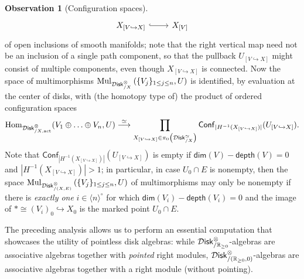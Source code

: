 \documentclass[10pt, reqno, twoside
, final
]{amsart}
\numberwithin{equation}{subsection}%
\theoremstyle{definition}
\theoremstyle{definition}
\theoremstyle{definition}
\theoremstyle{definition}
\theoremstyle{definition}
\theoremstyle{definition}
\theoremstyle{definition}
\theoremstyle{definition}
\theoremstyle{definition}
\theoremstyle{plain}
\theoremstyle{definition}
\newtheorem{obs}[defn]{Observation}
\theoremstyle{plain}
\theoremstyle{definition}
\theoremstyle{plain}
\theoremstyle{definition}
\theoremstyle{definition}
\theoremstyle{plain}
\theoremstyle{plain}
\theoremstyle{definition}
\theoremstyle{plain}
\theoremstyle{plain}
\theoremstyle{plain}
\begin{document}
\begin{obs}[Configuration spaces]
\[\begin{tikzcd}
    X_{[V\hookrightarrow X]} \ar[r,hook] & X_{[V]}
\end{tikzcd}
\]
of open inclusions of smooth manifolds; note that the right vertical map need not be an inclusion of a single path component, so that the pullback $U_{[V\hookrightarrow X]} $ might consist of multiple components, even though $X_{[V\hookrightarrow X]}$ is connected. Now the space of multimorphisms $\mathrm{Mul}_{\mathcal{D}\mathsf{isk}_{/X}^{\otimes}}\left(\{V_j\}_{1\leq j\leq n},U\right)$ is identified, by evaluation at the center of disks, with (the homotopy type of) the product of ordered configuration spaces
\[ \mathrm{Hom}_{\mathcal{D}\mathsf{isk}_{/X,\mathrm{act}}^{\otimes} }(V_1\oplus \ldots\oplus V_n,U)  \overset{\simeq}{\longrightarrow} \prod_{X_{[V\hookrightarrow X]}\in\pi_0\left(\mathcal{D}\mathsf{isk}^{\simeq}_{/X}\right)} \mathsf{Conf}_{|H^{-1}(X_{[V\hookrightarrow X]})|}(U_{[V\hookrightarrow X]}). \]
Note that $\mathsf{Conf}_{|H^{-1}(X_{[V\hookrightarrow X]})|}(U_{[V\hookrightarrow X]})$ is empty if $\mathsf{dim}(V)-\mathsf{depth}(V)=0$ and $|H^{-1}(X_{[V\hookrightarrow X]})|>1$; in particular, in case $U_0\cap E$ is nonempty, then the space $\mathrm{Mul}_{\mathcal{D}\mathsf{isk}_{/(X,E)}^{\otimes}}\left(\{V_j\}_{1\leq j\leq n},U\right)$ of multimorphisms may only be nonempty if there is \emph{exactly one} $i\in \langle n\rangle^{\circ}$ for which $\mathsf{dim}(V_i)-\mathsf{depth}(V_i)=0$ and the image of $*\cong (V_i)_0\hookrightarrow X_0$ is the marked point $U_0\cap E$.
\end{obs}

The preceding analysis allows us to perform an essential computation that showcases the utility of pointless disk algebras: while $\mathcal{D}\mathsf{isk}^{\otimes}_{/\mathbb{R}_{\geq 0}}$-algebras are associative algebras together with \emph{pointed} right modules, $\mathcal{D}\mathsf{isk}^{\otimes}_{/(\mathbb{R}_{\geq 0},0)}$-algebras are associative algebras together with a right module (without pointing).
\end{document}
